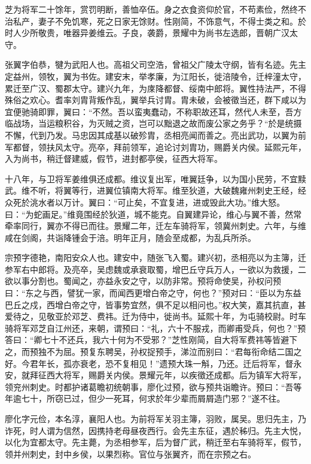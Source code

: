 \documentclass[12pt,UTF8]{ctexbook}
\begin{document}
芝为将军二十馀年，赏罚明断，善恤卒伍。身之衣食资仰於官，不苟素俭，然终不治私产，妻子不免饥寒，死之日家无馀财。性刚简，不饰意气，不得士类之和。於时人少所敬贵，唯器异姜维云。子良，袭爵，景耀中为尚书左选郎，晋朝广汉太守。

张翼字伯恭，犍为武阳人也。高祖父司空浩，曾祖父广陵太守纲，皆有名迹。先主定益州，领牧，翼为书佐。建安末，举孝廉，为江阳长，徙涪陵令，迁梓潼太守，累迁至广汉、蜀郡太守。建兴九年，为庲降都督、绥南中郎将。翼性持法严，不得殊俗之欢心。耆率刘胄背叛作乱，翼举兵讨胄。胄未破，会被徵当还，群下咸以为宜便驰骑即罪，翼曰：“不然。吾以蛮夷蠢动，不称职故还耳，然代人未至，吾方临战场，当运粮积谷，为灭贼之资，岂可以黜退之故而废公家之务乎？“於是统摄不懈，代到乃发。马忠因其成基以破殄胄，丞相亮闻而善之。亮出武功，以翼为前军都督，领扶风太守。亮卒，拜前领军，追论讨刘胄功，赐爵关内侯。延熙元年，入为尚书，稍迁督建威，假节，进封都亭侯，征西大将军。

十八年，与卫将军姜维俱还成都。维议复出军，唯翼廷争，以为国小民劳，不宜黩武。维不听，将翼等行，进翼位镇南大将军。维至狄道，大破魏雍州刺史王经，经众死於洮水者以万计。翼曰：“可止矣，不宜复进，进或毁此大功。”维大怒。曰：“为蛇画足。”维竟围经於狄道，城不能克。自翼建异论，维心与翼不善，然常牵率同行，翼亦不得已而往。景耀二年，迁左车骑将军，领冀州刺史。六年，与维咸在剑阁，共诣降锺会于涪。明年正月，随会至成都，为乱兵所杀。

宗预字德艳，南阳安众人也。建安中，随张飞入蜀。建兴初，丞相亮以为主簿，迁参军右中郎将。及亮卒，吴虑魏或承衰取蜀，增巴丘守兵万人，一欲以为救援，二欲以事分割也。蜀闻之，亦益永安之守，以防非常。预将命使吴，孙权问预曰：“东之与西，譬犹一家，而闻西更增白帝之守，何也？”预对曰：“臣以为东益巴丘之戍，西增白帝之守，皆事势宜然，俱不足以相问也。”权大笑，嘉其抗直，甚爱待之，见敬亚於邓芝、费祎。迁为侍中，徙尚书。延熙十年，为屯骑校尉。时车骑将军邓芝自江州还，来朝，谓预曰：“礼，六十不服戎，而卿甫受兵，何也？”预答曰：“卿七十不还兵，我六十何为不受邪？”芝性刚简，自大将军费祎等皆避下之，而预独不为屈。预复东聘吴，孙权捉预手，涕泣而别曰：“君每衔命结二国之好。今君年长，孤亦衰老，恐不复相见！”遗预大珠一斛，乃还。迁后将军，督永安，就拜征西大将军，赐爵关内侯。景耀元年，以疾徵还成都。后为镇军大将军，领兖州刺史。时都护诸葛瞻初统朝事，廖化过预，欲与预共诣瞻许。预曰：“吾等年逾七十，所窃已过，但少一死耳，何求於年少辈而屑屑造门邪？”遂不往。

廖化字元俭，本名淳，襄阳人也。为前将军关羽主簿，羽败，属吴。思归先主，乃诈死，时人谓为信然，因携持老母昼夜西行。会先主东征，遇於秭归。先主大悦，以化为宜都太守。先主薨，为丞相参军，后为督广武，稍迁至右车骑将军，假节，领并州刺史，封中乡侯，以果烈称。官位与张翼齐，而在宗预之右。
\end{document}
